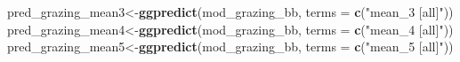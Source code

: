 \documentclass[
]{article}
\newenvironment{Shaded}{\begin{snugshade}}{\end{snugshade}}
\newcommand{\DataTypeTok}[1]{\textcolor[rgb]{0.13,0.29,0.53}{#1}}
\newcommand{\KeywordTok}[1]{\textcolor[rgb]{0.13,0.29,0.53}{\textbf{#1}}}
\newcommand{\NormalTok}[1]{#1}
\newcommand{\StringTok}[1]{\textcolor[rgb]{0.31,0.60,0.02}{#1}}
\begin{document}
\begin{Shaded}
\begin{Highlighting}[]
\NormalTok{pred\_grazing\_mean3\textless{}{-}}\KeywordTok{ggpredict}\NormalTok{(mod\_grazing\_bb,}
                              \DataTypeTok{terms =} \KeywordTok{c}\NormalTok{(}\StringTok{"mean\_3 [all]"}\NormalTok{))}
\NormalTok{pred\_grazing\_mean4\textless{}{-}}\KeywordTok{ggpredict}\NormalTok{(mod\_grazing\_bb,}
                              \DataTypeTok{terms =} \KeywordTok{c}\NormalTok{(}\StringTok{"mean\_4 [all]"}\NormalTok{))}
\NormalTok{pred\_grazing\_mean5\textless{}{-}}\KeywordTok{ggpredict}\NormalTok{(mod\_grazing\_bb,}
                              \DataTypeTok{terms =} \KeywordTok{c}\NormalTok{(}\StringTok{"mean\_5 [all]"}\NormalTok{))}
\end{Highlighting}
\end{Shaded}
\end{document}
